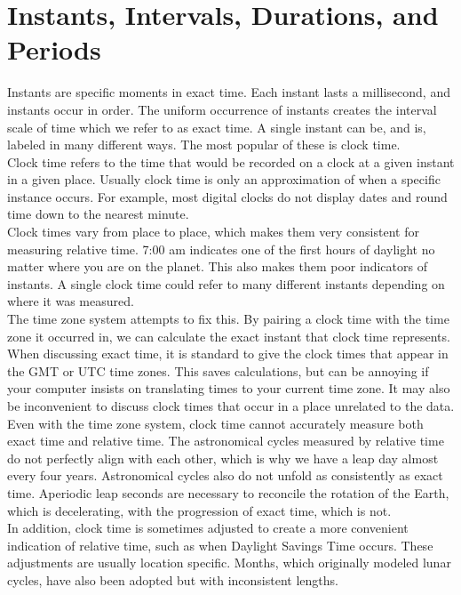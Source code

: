 \documentclass[article]{jss}
\begin{document}
\section{Instants, Intervals, Durations, and Periods}

Instants are specific moments in exact time. Each instant lasts a millisecond, and instants occur in order. The uniform occurrence of instants creates the interval scale of time which we refer to as exact time. A single instant can be, and is, labeled in many different ways.  The most popular of these is clock time.\\

Clock time refers to the time that would be recorded on a clock at a given instant in a given place. Usually clock time is only an approximation of when a specific instance occurs. For example, most digital clocks do not display dates and round time down to the nearest minute.\\

Clock times vary from place to place, which makes them very consistent for measuring relative time.  7:00 am indicates one of the first hours of daylight no matter where you are on the planet. This also makes them poor indicators of instants. A single clock time could refer to many different instants depending on where it was measured.\\

The time zone system attempts to fix this.  By pairing a clock time with the time zone it occurred in, we can calculate the exact instant that clock time represents. When discussing exact time, it is standard to give the clock times that appear in the GMT or UTC time zones.  This saves calculations, but can be annoying if your computer insists on translating times to your current time zone.  It may also be inconvenient to discuss clock times that occur in a place unrelated to the data.\\

Even with the time zone system, clock time cannot accurately measure both exact time and relative time. The astronomical cycles measured by relative time do not perfectly align with each other, which is why we have a leap day almost every four years. Astronomical cycles also do not unfold as consistently as exact time. Aperiodic leap seconds are necessary to reconcile the rotation of the Earth, which is decelerating, with the progression of exact time, which is not.\\

In addition, clock time is sometimes adjusted to create a more convenient indication of relative time, such as when Daylight Savings Time occurs.  These adjustments are usually location specific. Months, which originally modeled lunar cycles, have also been adopted but with inconsistent lengths.\\
\end{document}
